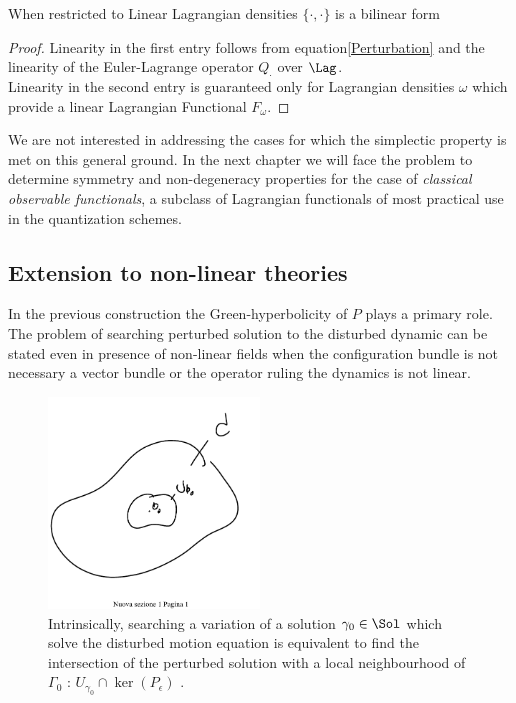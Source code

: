 \documentclass[Main]{subfiles}
\begin{document}
		\begin{proposition}[Bilinearity]
			When restricted to Linear Lagrangian densities $\{\cdot,\cdot\}$ is a bilinear form
		\end{proposition}
		\begin{proof}
			Linearity in the first entry follows from equation\ref{Perturbation} and the linearity of the Euler-Lagrange operator $Q_\cdot$ over $\Lag$.
			\\
			Linearity in the second entry is guaranteed only for Lagrangian densities $\omega$ which provide a linear Lagrangian Functional $F_\omega$.
		\end{proof}
		We are not interested in addressing the cases for which the simplectic property is met on this general ground. 
		In the next chapter we will face the problem to determine  symmetry and non-degeneracy properties for the case of  \emph{classical observable functionals}, a subclass of Lagrangian functionals of most practical use in the quantization schemes.

	\subsection{Extension to non-linear theories}\label{Section:NonLinearPeierls}
		In the previous construction the Green-hyperbolicity of $P$ plays a primary role.
		The problem of searching perturbed solution to the disturbed dynamic can be stated even in presence  of non-linear fields  when the configuration bundle is not necessary a vector bundle or the operator ruling the dynamics is not linear.
		\begin{figure}[h!]
				  \centering
			   	\includegraphics[width=0.5\textwidth]{Pictures/Linearization} 
   	  			\caption{Intrinsically, searching a variation of a solution $\gamma_0\in \Sol$ which solve the disturbed motion equation is equivalent to find the intersection of the perturbed solution with a local neighbourhood of $\Gamma_0$ : $U_{\gamma_0}\cap\ker(P_\epsilon)$ .}
		\end{figure}		
		
\end{document}
